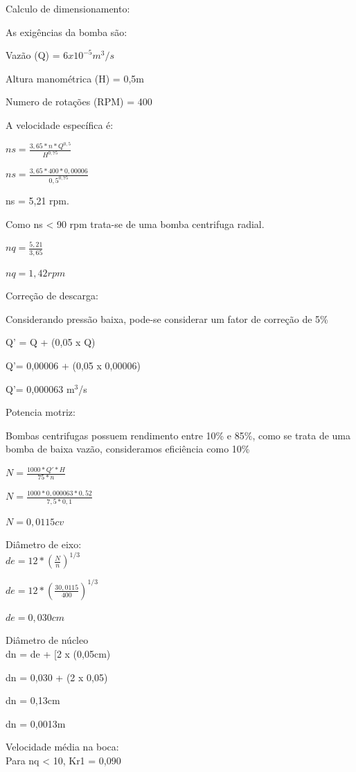 Calculo de dimensionamento:

As exigências da bomba são:

Vazão (Q) = $6x10^{-5} m^{3}/s$
    
Altura manométrica (H) = 0,5m
    
Numero de rotações (RPM) = 400
    

A velocidade específica é:

$ns = \frac{3,65 * n * Q^{0,5}}{H^{0,75}} $

$ns = \frac{3,65 *  400 * 0,00006}{0,5^{0,75}} $

 ns = 5,21 rpm.
 
 Como ns < 90 rpm trata-se de uma bomba centrifuga radial.

$nq = \frac{5,21}{3,65}$

$nq = 1,42 rpm$

Correção de descarga:

Considerando pressão baixa, pode-se considerar um fator de correção de 5\%

Q’ = Q + (0,05 x Q)

Q’= 0,00006 + (0,05 x 0,00006)

Q’= 0,000063 m$^{3}$/s


Potencia motriz:

Bombas centrifugas possuem rendimento entre 10\% e 85\%, como se trata de uma bomba de baixa vazão, consideramos eficiência como 10\%

$N = \frac{1000 *Q' * H}{75 * n}$

$N = \frac{1000 * 0,000063 * 0,52}{7,5 * 0,1}$
 
$N = 0,0115 cv$

Diâmetro de eixo:\\

    $de = 12 * (\frac{N}{n})^{1/3}$
    
    $de = 12 * (\frac{30,0115}{400})^{1/3}$
    
    $de= 0,030 cm$
    
Diâmetro de núcleo\\

    dn = de + [2 x (0,05cm)
    
    dn = 0,030 + (2 x 0,05)
    
    dn = 0,13cm
    
    dn = 0,0013m
    
Velocidade média na boca:\\

    Para nq < 10, Kr1 = 0,090
    
